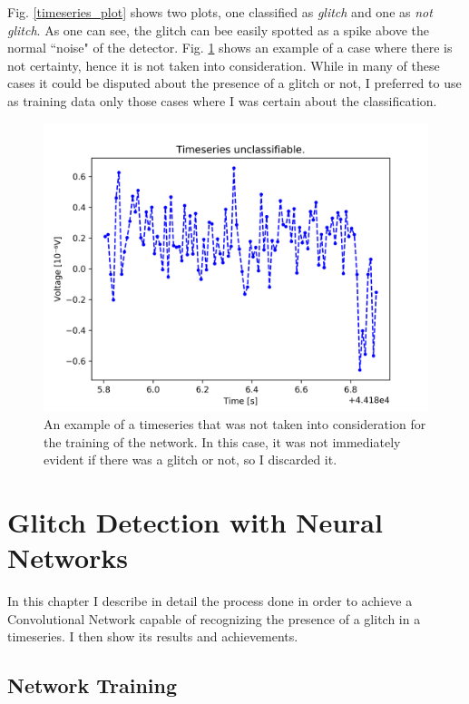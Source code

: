 \documentclass[12pt,a4paper,final]{book}			%
\begin{document}
				Fig. \ref{timeseries_plot} shows two plots, one classified as \textit{glitch} and one as \textit{not glitch}. As one can see, the glitch can bee easily spotted as a spike above the normal ``noise" of the detector. 
				Fig. \ref{unclassifiable_plot} shows an example of a case where there is not certainty, hence it is not taken into consideration. While in many of these cases it could be disputed about the presence of a glitch or not, I preferred to use as training data only those cases where I was certain about the classification.
				
				\begin{figure}[h!]
					\centering
					\includegraphics[scale=0.5]{figures/unclassifiable.png}
					\caption{An example of a timeseries that was not taken into consideration for the training of the network. In this case, it was not immediately evident if there was a glitch or not, so I discarded it.}
					\label{unclassifiable_plot}
				\end{figure}
			

\chapter{Glitch Detection with Neural Networks}\label{glitch_neural_networks}
		In this chapter I describe in detail the process done in order to achieve a Convolutional Network capable of recognizing the presence of a glitch in a timeseries. 	I then show its results and achievements.
		\section{Network Training}\label{network_training}
\end{document}
